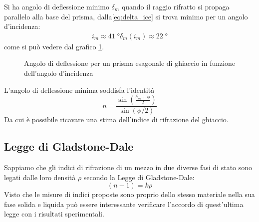 \documentclass{report}[a4paper,11pt]
\begin{document}
Si ha angolo di deflessione minimo $\delta_m$ quando il raggio rifratto si propaga parallelo alla base del prisma, dalla\eqref{eq:delta_ice} si trova minimo per un angolo d'incidenza:
\begin{align}
i_m \approx 41 \; \si{\degree}
\delta_m(i_m) \approx 22 \; \si{\degree}
\end{align}
come si può vedere dal grafico \ref{fig:delta_ice}.
\begin{figure}[!htb]
	\centering
		\scalebox{0.8}{}
	\caption{Angolo di deflessione per un prisma esagonale di ghiaccio in funzione dell'angolo d'incidenza \label{fig:delta_ice}}
\end{figure}
L'angolo di deflessione minima soddisfa l'identità
\begin{equation}\label{eq:prism}
n = \frac{\sin\left(\frac{\delta_m + \phi}{2}\right)}{\sin (\phi/2)}
\end{equation}
Da cui è possibile ricavare una stima dell'indice di rifrazione del ghiaccio.
\subsection{Legge di Gladstone-Dale}
Sappiamo che gli indici di rifrazione di un mezzo in due diverse fasi di stato sono legati dalle loro densità $\rho$ secondo la Legge di Gladstone-Dale:
\begin{equation}\label{eq:Glad}
(n-1) = k \rho
\end{equation}
Visto che le misure di indici proposte sono proprio dello stesso materiale nella sua fase solida e liquida può essere interessante verificare l'accordo di quest'ultima legge con i risultati sperimentali.
\end{document}
